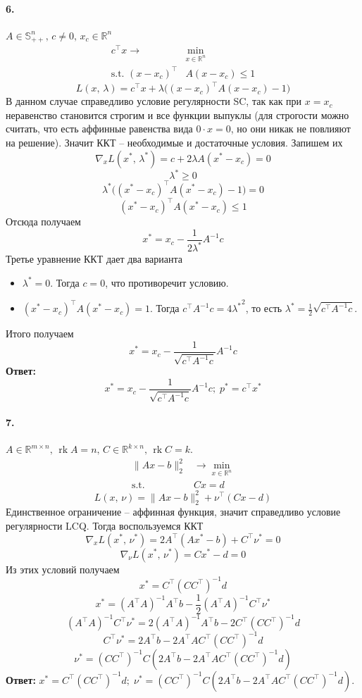 \documentclass{article}
\DeclareMathOperator{\rk}{rk}
\newcommand*{\R}{\mathbb{R}}
\newcommand*{\st}{\text{s.t. }}
\newcommand*{\1}{\mathbf{1}}
\begin{document}
\paragraph{6.} $A \in \mathbb{S}_{++}^n,\, c \neq 0,\, x_c \in \R^n$
\[ \begin{split}
    c^\top x \to &\min\limits_{x \in \R^n} \\
    \st (x - x_c)^\top & A (x - x_c) \leqslant 1
\end{split} \]
\[ L(x,\, \lambda) = c^\top x + \lambda \big( (x - x_c)^\top A (x - x_c) - 1 \big) \]
В данном случае справедливо условие регулярности SC, так как при $x = x_c$ неравенство становится строгим и все функции выпуклы (для строгости можно считать, что есть аффинные равенства вида $0 \cdot x = 0$, но они никак не повлияют на решение). Значит ККТ -- необходимые и достаточные условия. Запишем их
\[ \nabla_x L(x^\ast,\, \lambda^\ast) = c + 2\lambda A(x^\ast - x_c) = 0 \]
\[ \lambda^\ast \geqslant 0 \]
\[ \lambda^\ast \big( (x^\ast - x_c)^\top A (x^\ast - x_c) - 1 \big) = 0 \]
\[ (x^\ast - x_c)^\top A (x^\ast - x_c) \leqslant 1 \]
Отсюда получаем
\[ x^\ast = x_c - \frac{1}{2\lambda^\ast} A^{-1} c \]
Третье уравнение ККТ дает два варианта
\begin{itemize}
    \item $\lambda^\ast = 0$. Тогда $c = 0$, что противоречит условию.
    \item $(x^\ast - x_c)^\top A (x^\ast - x_c) = 1$. Тогда $c^\top A^{-1} c = 4{\lambda^\ast}^2$, то есть $\lambda^\ast = \frac12 \sqrt{c^\top A^{-1} c}$. 
\end{itemize}
Итого получаем
\[ x^\ast = x_c - \frac{1}{\sqrt{c^\top A^{-1} c}} A^{-1} c \]
\textbf{Ответ:}
\[ x^\ast = x_c - \frac{1}{\sqrt{c^\top A^{-1} c}} A^{-1} c;\; p^\ast = c^\top x^\ast \]


\paragraph{7.} $A \in \R^{m \times n},\, \rk A = n,\, C \in \R^{k \times n},\, \rk C = k$.
\[ \begin{split}
    \| Ax - b \|_2^2 &\to \min\limits_{x \in \R^n} \\
    \st & Cx = d
\end{split} \]
\[ L(x,\, \nu) = \| Ax - b \|_2^2 + \nu^\top (Cx - d) \]
Единственное ограничение -- аффинная функция, значит справедливо условие регулярности LCQ. Тогда воспользуемся ККТ
\[ \nabla_x L(x^\ast,\, \nu^\ast) = 2 A^\top (Ax^\ast - b) + C^\top \nu^\ast = 0 \]
\[ \nabla_\nu L(x^\ast,\, \nu^\ast) = Cx^\ast - d = 0 \]
Из этих условий получаем
\[ x^\ast = C^\top \left(C C^\top\right)^{-1} d \]
\[ x^\ast = \left(A^\top A\right)^{-1} A^\top b - \frac12 \left(A^\top A\right)^{-1} C^\top \nu^\ast \]
\[ \left(A^\top A\right)^{-1} C^\top \nu^\ast = 2 \left(A^\top A\right)^{-1} A^\top b - 2 C^\top \left(C C^\top\right)^{-1} d \]
\[ C^\top \nu^\ast = 2 A^\top b - 2 A^\top A C^\top \left(C C^\top\right)^{-1} d \]
\[ \nu^\ast = \left(C C^\top\right)^{-1} C \left( 2 A^\top b - 2 A^\top A C^\top \left(C C^\top\right)^{-1} d \right) \]
\textbf{Ответ: } $x^\ast = C^\top \left(C C^\top\right)^{-1} d;\; \nu^\ast = \left(C C^\top\right)^{-1} C \left( 2 A^\top b - 2 A^\top A C^\top \left(C C^\top\right)^{-1} d \right).$
\end{document}
